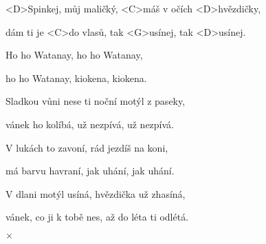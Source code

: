 

\zs
<D>Spinkej, můj maličký, <C>máš v očích <D>hvězdičky,

dám ti je <C>do vlasů, tak <G>usínej, tak <D>usínej.
\ks

\zr
Ho ho Watanay, ho ho Watanay,

ho ho Watanay, kiokena, kiokena.
\kr

\zs
Sladkou vůni nese ti noční motýl z paseky,

vánek ho kolíbá, už nezpívá, už nezpívá.
\ks

\zr
\kr

\zs
V lukách to zavoní, rád jezdíš na koni,

má barvu havraní, jak uhání, jak uhání.
\ks

\zr
\kr

\zs
V dlani motýl usíná, hvězdička už zhasíná,

vánek, co ji k tobě nes, až do léta ti odlétá.
\ks

$\times$ \kr

\kp
